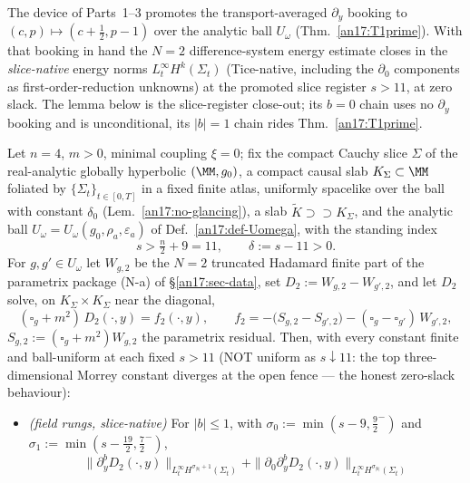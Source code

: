 The device of Parts~1--3 promotes the transport-averaged $\partial_y$ booking
to $(c,p)\mapsto(c+\tfrac12,p-1)$ over the analytic ball $U_\omega$
(Thm.~\ref{an17:T1prime}). With that booking in hand the $N{=}2$
difference-system energy estimate closes in the \emph{slice-native} energy
norms $L^\infty_t H^k(\Sigma_t)$ (Tice-native, including the $\partial_0$
components as first-order-reduction unknowns) at the promoted slice register
$s>11$, at zero slack. The lemma below is the slice-register close-out; its
$b{=}0$ chain uses no $\partial_y$ booking and is unconditional, its $|b|=1$
chain rides Thm.~\ref{an17:T1prime}.

\begin{lemma}[$N{=}2$ two-slot difference-system energy estimate, slice
register; the mixed $(1,1)$ coincidence value at the Lipschitz rate for
$s>n/2+9=11$, zero slack]\label{an17:slice-ladder}
Let $n=4$, $m>0$, minimal coupling $\xi=0$; fix the compact Cauchy slice
$\Sigma$ of the real-analytic globally hyperbolic $(\MM,g_0)$, a compact causal
slab $K_\Sigma\subset\MM$ foliated by $\{\Sigma_t\}_{t\in[0,T]}$ in a fixed
finite atlas, uniformly spacelike over the ball with constant $\delta_0$
(Lem.~\ref{an17:no-glancing}), a slab $\widetilde K\supset\supset K_\Sigma$, and
the analytic ball $U_\omega=U_\omega(g_0,\rho_a,\varepsilon_a)$ of
Def.~\ref{an17:def-Uomega}, with the standing index
\[
  s>\tfrac n2+9=11,\qquad\delta:=s-11>0 .
\]
For $g,g'\in U_\omega$ let $W_{g,2}$ be the $N{=}2$ truncated Hadamard finite
part of the parametrix package \textup{(N-a)} of \S\ref{an17:sec-data}, set
$D_2:=W_{g,2}-W_{g',2}$, and let $D_2$ solve, on $K_\Sigma\times K_\Sigma$ near
the diagonal,
\begin{equation}\label{an17:eq-slice-system}
 (\square_g+m^2)\,D_2(\cdot,y)=f_2(\cdot,y),\qquad
 f_2=-\bigl(S_{g,2}-S_{g',2}\bigr)-(\square_g-\square_{g'})\,W_{g',2},
\end{equation}
$S_{g,2}:=(\square_g+m^2)W_{g,2}$ the parametrix residual. Then, with every
constant finite and ball-uniform at each fixed $s>11$ \textup{(}NOT uniform as
$s\downarrow11$: the top three-dimensional Morrey constant diverges at the open
fence --- the honest zero-slack behaviour\textup{)}:
\begin{itemize}
\item[(i)] \emph{(field rungs, slice-native)} For $|b|\le1$, with
  $\sigma_0:=\min(s-9,\tfrac92^-)$ and
  $\sigma_1:=\min(s-\tfrac{19}2,\tfrac72^-)$,
  \[
   \|\partial_y^bD_2(\cdot,y)\|_{L^\infty_t H^{\sigma_{|b|}+1}(\Sigma_t)}
   +\|\partial_0\partial_y^bD_2(\cdot,y)\|_{L^\infty_t H^{\sigma_{|b|}}(\Sigma_t)}
\]
\end{itemize}
\end{lemma}

